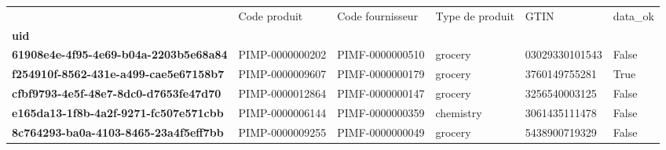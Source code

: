 \begin{tabularx}{\linewidth}{lXXXXX}
\toprule
{} &     Code produit & Code fournisseur & Type de produit &            GTIN &  data\_ok \\
\textbf{uid                                 } &                  &                  &                 &                 &          \\
\midrule
\textbf{61908e4e-4f95-4e69-b04a-2203b5e68a84} &  PIMP-0000000202 &  PIMF-0000000510 &         grocery &  03029330101543 &    False \\
\textbf{f254910f-8562-431e-a499-cae5e67158b7} &  PIMP-0000009607 &  PIMF-0000000179 &         grocery &   3760149755281 &     True \\
\textbf{cfbf9793-4e5f-48e7-8dc0-d7653fe47d70} &  PIMP-0000012864 &  PIMF-0000000147 &         grocery &   3256540003125 &    False \\
\textbf{e165da13-1f8b-4a2f-9271-fc507e571cbb} &  PIMP-0000006144 &  PIMF-0000000359 &       chemistry &   3061435111478 &    False \\
\textbf{8c764293-ba0a-4103-8465-23a4f5eff7bb} &  PIMP-0000009255 &  PIMF-0000000049 &         grocery &   5438900719329 &    False \\
\bottomrule
\end{tabularx}
